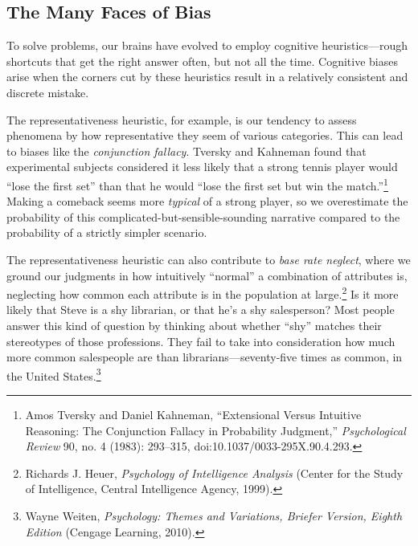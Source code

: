 \documentclass[letterpaper]{book}
\newcommand{\comment}[1]{
}
\begin{document}
\subsection{The Many Faces of Bias}

{
 To solve problems, our brains have evolved to employ cognitive
heuristics---rough shortcuts that get the right answer often, but not
all the time. Cognitive biases arise when the corners cut by these
heuristics result in a relatively consistent and discrete mistake.}

{
 The representativeness heuristic, for example, is our tendency to
assess phenomena by how representative they seem of various categories.
This can lead to biases like the \textit{conjunction fallacy}. Tversky
and Kahneman found that experimental subjects considered it less likely
that a strong tennis player would ``lose the first
set'' than that he would ``lose the
first set but win the match.''\footnote{Amos Tversky and Daniel Kahneman,
``Extensional Versus Intuitive Reasoning: The
Conjunction Fallacy in Probability Judgment,''
\textit{Psychological Review} 90, no. 4 (1983): 293--315,
doi:10.1037/0033-295X.90.4.293.\comment{7}}
Making a comeback seems more \textit{typical} of a strong player, so we
overestimate the probability of this complicated-but-sensible-sounding
narrative compared to the probability of a strictly simpler scenario.}

{
 The representativeness heuristic can also contribute to
\textit{base rate neglect}, where we ground our judgments in how
intuitively ``normal'' a combination
of attributes is, neglecting how common each attribute is in the
population at large.\footnote{Richards J. Heuer, \textit{Psychology of Intelligence Analysis}
(Center for the Study of Intelligence, Central Intelligence Agency,
1999).\comment{8}} Is it more likely that Steve is
a shy librarian, or that he's a shy salesperson? Most
people answer this kind of question by thinking about whether
``shy'' matches their stereotypes of
those professions. They fail to take into consideration how much more
common salespeople are than librarians---seventy-five times as common,
in the United States.\footnote{Wayne Weiten, \textit{Psychology: Themes and Variations,
Briefer Version, Eighth Edition} (Cengage Learning, 2010).\comment{9}}}
\end{document}

